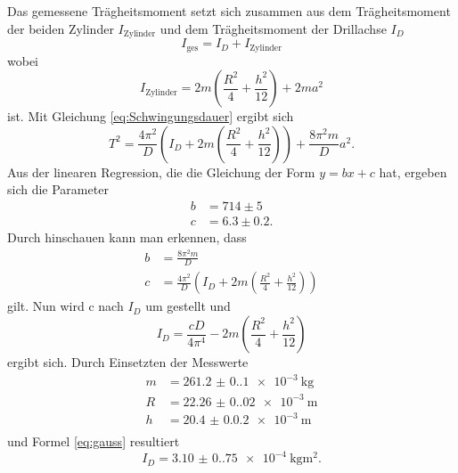 Das gemessene Trägheitsmoment setzt sich zusammen aus dem Trägheitsmoment der beiden Zylinder $I_\text{Zylinder}$
  und dem Trägheitsmoment der Drillachse $I_D$
  \begin{equation}
    I_{\text{ges}} = I_D + I_{\text{Zylinder}}
   \end{equation}
wobei
    \begin{equation}
    I_{\text{Zylinder}} = 2m(\frac{R^2}{4}+\frac{h^2}{12})+2ma^2
  \end{equation}
  ist.
Mit Gleichung \ref{eq:Schwingungsdauer} ergibt sich
  \begin{equation}
    T^2 = \frac{4 \pi^2}{D}(I_D + 2m(\frac{R^2}{4}+\frac{h^2}{12}))+\frac{8 \pi^2 m}{D}a^2.
    \label{equ:T^2}
  \end{equation}
Aus der linearen Regression, die die Gleichung der Form $y = b x + c$ hat, ergeben sich die Parameter
  \begin{align*}
    b &= 714 \pm 5 \\
    c &= 6.3 \pm 0.2.
  \end{align*}
Durch hinschauen kann man erkennen, dass
  \begin{align*}
    b &= \frac{8 \pi^2 m}{D} \\
    c &= \frac{4 \pi^2}{D}(I_D + 2m(\frac{R^2}{4}+\frac{h^2}{12}))
  \end{align*}
  gilt.
  Nun wird c nach $I_D$ um gestellt und
  \begin{equation}
    I_D = \frac{cD}{4\pi^4}- 2m(\frac{R^2}{4}+\frac{h^2}{12})
  \end{equation}
  ergibt sich.
  Durch Einsetzten der Messwerte
  \begin{align*}
    m &= \SI{261.2(0.1)e-3}{\kilogram} \\
    R &= \SI{22.26(0.02)e-3}{\meter}\\
    h &= \SI{20.4(0.02)e-3}{\meter}\\
  \end{align*}
  und Formel \ref{eq:gauss} resultiert
  \begin{equation*}
    I_D = \SI{3.10(0.75)e-4}{\kilogram \meter\squared}.
  \end{equation*}


